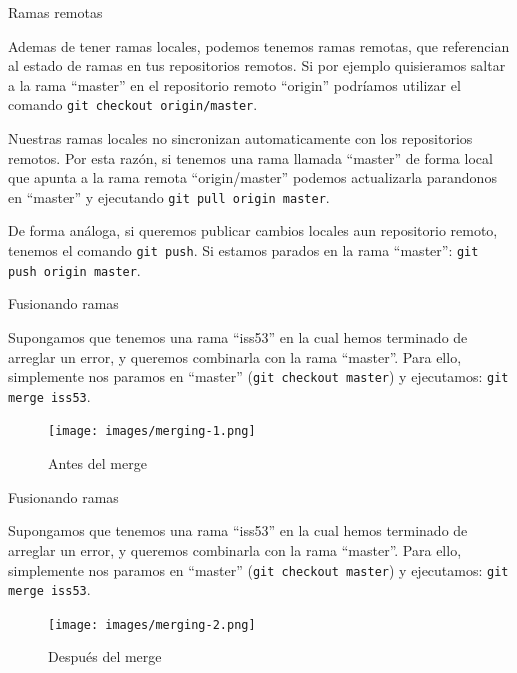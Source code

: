 \documentclass{beamer}
\begin{document}
\begin{frame}{Ramas remotas}

    Ademas de tener ramas locales, podemos tenemos ramas remotas, que referencian al estado de ramas en tus repositorios remotos.
    Si por ejemplo quisieramos saltar a la rama ``master'' en el repositorio remoto ``origin'' podríamos utilizar el comando \texttt{git checkout origin/master}.

    \vspace{1em}

    Nuestras ramas locales no sincronizan automaticamente con los repositorios remotos. Por esta razón, si tenemos una rama llamada ``master'' de forma local que
    apunta a la rama remota ``origin/master'' podemos actualizarla parandonos en ``master'' y ejecutando \texttt{git pull origin master}.

    \vspace{1em}

    De forma análoga, si queremos publicar cambios locales aun repositorio remoto, tenemos el comando \texttt{git push}. Si estamos parados en la rama ``master'':
    \texttt{git push origin master}.

\end{frame}

\begin{frame}{Fusionando ramas}

    Supongamos que tenemos una rama ``iss53'' en la cual hemos terminado de arreglar un error, y queremos combinarla con la rama ``master''.
    Para ello, simplemente nos paramos en ``master'' (\texttt{git checkout master}) y ejecutamos: \texttt{git merge iss53}.

	\begin{figure}[ht]
		\begin{center}
			\texttt{[image: images/merging-1.png]}
		\end{center}
		\caption{Antes del merge}
	\end{figure}

\end{frame}

\begin{frame}{Fusionando ramas}

    Supongamos que tenemos una rama ``iss53'' en la cual hemos terminado de arreglar un error, y queremos combinarla con la rama ``master''.
    Para ello, simplemente nos paramos en ``master'' (\texttt{git checkout master}) y ejecutamos: \texttt{git merge iss53}.

	\begin{figure}[ht]
		\begin{center}
			\texttt{[image: images/merging-2.png]}
		\end{center}
		\caption{Después del merge}
	\end{figure}

\end{frame}
\end{document}

